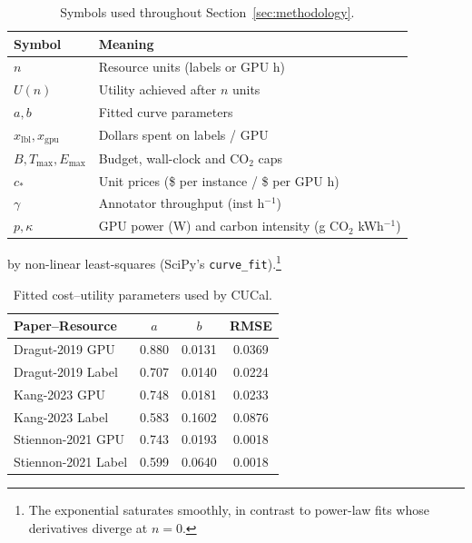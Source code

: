\documentclass[11pt]{article}
\begin{document}
\begin{table}[htbp]
  \centering
  \caption{Symbols used throughout Section~\ref{sec:methodology}.}
  \begin{tabular}{@{}ll@{}}
    \toprule
    Symbol & Meaning \\ \midrule
    $n$            & Resource units (labels or GPU h) \\
    $U(n)$         & Utility achieved after $n$ units \\
    $a,b$          & Fitted curve parameters \\
    $x_{\mathrm{lbl}},x_{\mathrm{gpu}}$ & Dollars spent on labels / GPU \\
    $B,T_{\max},E_{\max}$ & Budget, wall-clock and CO$_2$ caps \\
    $c_{\ast}$     & Unit prices (\$ per instance / \$ per GPU h) \\
    $\gamma$       & Annotator throughput (inst h$^{-1}$) \\
    $p,\kappa$     & GPU power (W) and carbon intensity (g CO$_2$ kWh$^{-1}$) \\
    \bottomrule
  \end{tabular}
  \label{tab:notation}
\end{table}

by non-linear least-squares (SciPy’s
\texttt{curve\_fit}).\footnote{The exponential saturates smoothly,
in contrast to power-law fits whose derivatives diverge at \(n{=}0\).}

\begin{table}[ht]
  \centering
  \caption{Fitted cost–utility parameters used by CUCal.}
  \label{tab:curves}
  \begin{tabular}{lccc}
    \toprule
    Paper–Resource            & $a$     & $b$      & RMSE  \\
    \midrule
    Dragut-2019 GPU           & 0.880   & 0.0131   & 0.0369 \\
    Dragut-2019 Label         & 0.707   & 0.0140   & 0.0224 \\
    Kang-2023 GPU             & 0.748   & 0.0181   & 0.0233 \\
    Kang-2023 Label           & 0.583   & 0.1602   & 0.0876 \\
    Stiennon-2021 GPU         & 0.743   & 0.0193   & 0.0018 \\
    Stiennon-2021 Label       & 0.599   & 0.0640   & 0.0018 \\
    \bottomrule
  \end{tabular}
\end{table}
\end{document}
